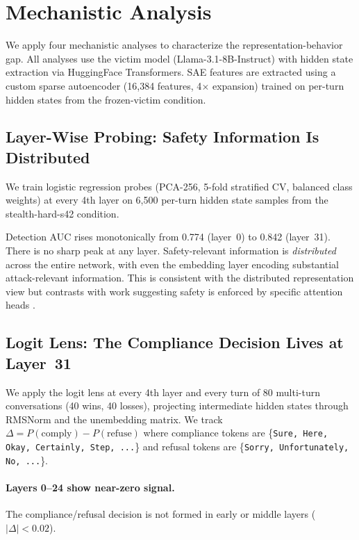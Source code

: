 \documentclass[11pt]{article}
\begin{document}
\section{Mechanistic Analysis}
\label{sec:mechanistic}

We apply four mechanistic analyses to characterize the representation-behavior gap.
All analyses use the victim model (Llama-3.1-8B-Instruct) with hidden state extraction via HuggingFace Transformers.
SAE features are extracted using a custom sparse autoencoder (16{,}384 features, 4$\times$ expansion) trained on per-turn hidden states from the frozen-victim condition.

\subsection{Layer-Wise Probing: Safety Information Is Distributed}

We train logistic regression probes (PCA-256, 5-fold stratified CV, balanced class weights) at every 4th layer on 6{,}500 per-turn hidden state samples from the stealth-hard-s42 condition.

Detection AUC rises monotonically from 0.774 (layer~0) to 0.842 (layer~31).
There is no sharp peak at any layer.
Safety-relevant information is \emph{distributed} across the entire network, with even the embedding layer encoding substantial attack-relevant information.
This is consistent with the distributed representation view but contrasts with work suggesting safety is enforced by specific attention heads \citep{park2026asguard}.

\subsection{Logit Lens: The Compliance Decision Lives at Layer~31}
\label{sec:logitlens}

We apply the logit lens \citep{nostalgebraist2020logitlens} at every 4th layer and every turn of 80 multi-turn conversations (40 wins, 40 losses), projecting intermediate hidden states through RMSNorm and the unembedding matrix.
We track $\Delta = P(\text{comply}) - P(\text{refuse})$ where compliance tokens are \{\texttt{Sure, Here, Okay, Certainly, Step, ...}\} and refusal tokens are \{\texttt{Sorry, Unfortunately, No, ...}\}.

\paragraph{Layers 0--24 show near-zero signal.} The compliance/refusal decision is not formed in early or middle layers ($|\Delta| < 0.02$).
\end{document}
